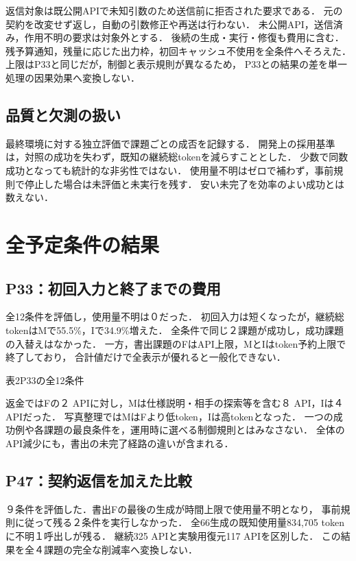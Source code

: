 \documentclass[uplatex,a4paper,twocolumn,10pt]{jsarticle}
\begin{document}
返信対象は既公開APIで未知引数のため送信前に拒否された要求である．
元の契約を改変せず返し，自動の引数修正や再送は行わない．
未公開API，送信済み，作用不明の要求は対象外とする．
後続の生成・実行・修復も費用に含む．
残予算通知，残量に応じた出力枠，初回キャッシュ不使用を全条件へそろえた．
上限はP33と同じだが，制御と表示規則が異なるため，
P33との結果の差を単一処理の因果効果へ変換しない．

\subsection{品質と欠測の扱い}
最終環境に対する独立評価で課題ごとの成否を記録する．
開発上の採用基準は，対照の成功を失わず，既知の継続総tokenを減らすこととした．
少数で同数成功となっても統計的な非劣性ではない．
使用量不明はゼロで補わず，事前規則で停止した場合は未評価と未実行を残す．
安い未完了を効率のよい成功とは数えない．

\clearpage
\section{全予定条件の結果}
\subsection{P33：初回入力と終了までの費用}
全12条件を評価し，使用量不明は０だった．
初回入力は短くなったが，継続総tokenはMで55.5\%，Iで34.9\%増えた．
全条件で同じ２課題が成功し，成功課題の入替えはなかった．
一方，書出課題のFはAPI上限，MとIはtoken予約上限で終了しており，
合計値だけで全表示が優れると一般化できない．

\begin{center}
\begin{minipage}{\columnwidth}\centering
\small 表2\quad P33の全12条件\par\smallskip
\EvidencePThirtyThreeTasks
\end{minipage}
\end{center}

返金ではFの２ APIに対し，Mは仕様説明・相手の探索等を含む８ API，Iは４ APIだった．
写真整理ではMはFより低token，Iは高tokenとなった．
一つの成功例や各課題の最良条件を，運用時に選べる制御規則とはみなさない．
全体のAPI減少にも，書出の未完了経路の違いが含まれる．

\newpage
\subsection{P47：契約返信を加えた比較}
９条件を評価した．書出Fの最後の生成が時間上限で使用量不明となり，
事前規則に従って残る２条件を実行しなかった．
全66生成の既知使用量834,705 tokenに不明１呼出しが残る．
継続325 APIと実験用復元117 APIを区別した．
この結果を全４課題の完全な削減率へ変換しない．
\end{document}
